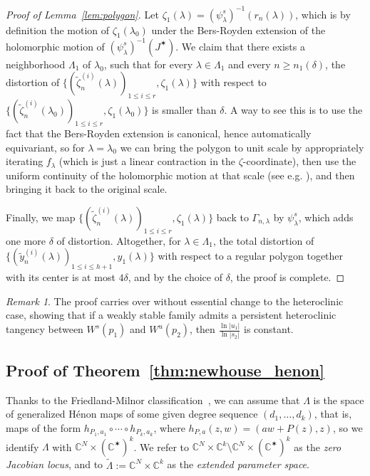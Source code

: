 \documentclass[11pt, oneside]{amsart}
\newcommand{\C}{\mathbb{C}}
\newcommand{\abs}[1]{\left\vert#1\right\vert}
\newcommand{\la}{\lambda}
\newcommand{\lo}{{\lambda_0}}
\newcommand{\jstar}{J^\varstar}
\newcommand{\inv}{^{-1}}
\theoremstyle{remark}
\newtheorem{rmk}[prop]{Remark}
\theoremstyle{definition}
\theoremstyle{theorem}
\newcommand{\commentaire}[1]{}
\begin{document}
\begin{proof}[Proof of Lemma~\ref{lem:polygon}]
 Let $\zeta_1 (\la)  = (\psi_\lambda^s)\inv(r_n(\la))$,
 which is by definition the   motion of $\zeta_1(\lo)$ 
 under the Bers-Royden extension of the holomorphic motion of 
 $(\psi_\la^s)\inv (\jstar)$. We claim  that  there exists a neighborhood $\Lambda_1$ of $\lo$, 
 such that for every $\la\in \Lambda_1$ and   every 
 $n\geq n_1(\delta)$, the distortion of 
$\big\{ (\tilde \zeta_n^{(i)}(\lambda))_{1\leq i\leq r}, \zeta_1 (\la) \big\}$ with respect to  
$\big\{(\tilde \zeta_n^{(i)}(\lo))_{1\leq i\leq r}, \zeta_1 (\lo) \big\}$ is smaller than $\delta$. 
A way to see this is to 
use the fact that the Bers-Royden extension is canonical, hence automatically equivariant, so 
for $\la =\lo$ 
we can bring   the polygon to unit scale by appropriately iterating $f_\lambda$ (which is just a linear contraction in the $\zeta$-coordinate), then use 
 the uniform continuity  of the holomorphic motion at that scale (see e.g. 
\cite[Cor. 2]{bers-royden}), and then bringing it back to the original scale. 

Finally, we map 
$\big\{ (\tilde \zeta_n^{(i)}(\lambda))_{1\leq i\leq r}, \zeta_1 (\la) \big\}$ back to 
$\Gamma_{n, \la}$ by $\psi^s_\la$, which adds one more $\delta$ of distortion. Altogether,
for $\lambda\in \Lambda_1$, 
the total distortion of $\big\{(\tilde y_n^{(i)}(\la))_{1\leq i\leq h+1}, y_1(\la)\big\}$ with respect to 
a regular polygon together with its center is at most $4\delta$,  
and by the choice of $\delta$, 
the proof is complete. 
\end{proof}


\begin{rmk}
The proof carries over without essential change to the heteroclinic case,  showing that if a 
weakly stable family admits a    persistent heteroclinic tangency between
$W^s(p_1) $ and $W^u(p_2)$, then $\frac{\ln\abs{u_1}}{\ln \abs{s_2}}$ is constant. 
\end{rmk}


\subsection{Proof of Theorem~\ref{thm:newhouse_henon}}  
Thanks to  the Friedland-Milnor classification~\cite{FM},  we can assume that 
$\Lambda$ is  the space of generalized Hénon maps of some given degree sequence $(d_1, \ldots, d_k)$, that 
is, maps  of the form $h_{P_1, a_1}\circ \cdots \circ  h_{P_k, a_k}$, where $h_{P, a}(z,w) = (aw+P(z), z)$, 
so we identify $\Lambda$
 with   $\C^N\times (\C^\varstar)^k$. 
 We refer to $\C^N\times \C^k\setminus\C^N\times (\C^\varstar)^k$ 
 as the \emph{zero Jacobian locus}\commentaire{cf. Minor comment \#9}, and to 
$\widetilde \Lambda  := \C^N\times \C^k$ as the \emph{extended parameter space}. 
 
\end{document}
